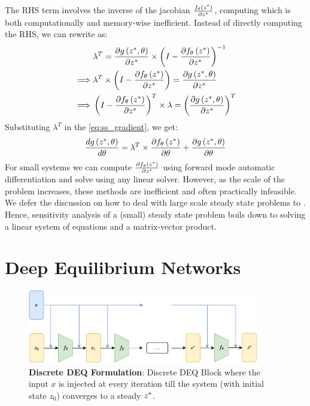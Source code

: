 The RHS term involves the inverse of the jacobian $\frac{f_\theta\left(z^*\right)}{\partial z^*}$, computing which is both computationally and memory-wise inefficient. Instead of directly computing the RHS, we can rewrite  as:
%
\begin{align}
  & \lambda^T = \frac{\partial g\left(z^*, \theta\right)}{\partial z^*} \times \left( I - \frac{\partial f_\theta\left(z^*\right)}{\partial z^*} \right)^{-1}\\
  \implies & \lambda^T \times \left( I - \frac{\partial f_\theta\left(z^*\right)}{\partial z^*} \right) = \frac{\partial g\left(z^*, \theta\right)}{\partial z^*}\\
  \implies & \left( I - \frac{\partial f_\theta\left(z^*\right)}{\partial z^*} \right)^T \times \lambda = \left(\frac{\partial g\left(z^*, \theta\right)}{\partial z^*}\right)^T \label{eq:ss_lambda_linear}
\end{align}
%
Substituting $\lambda^T$ in the \cref{eq:ss_gradient}, we get:
%
\begin{equation}
  \frac{d g\left(z^*, \theta\right)}{d \theta} = \lambda^T \times \frac{\partial f_\theta\left(z^*\right)}{\partial \theta} + \frac{\partial g\left(z^*, \theta\right)}{\partial \theta} \label{eq:ss_total_gradient}
\end{equation}
%
For small systems we can compute $\frac{\partial f_\theta\left(z^*\right)}{\partial z^*}$ using forward mode automatic differentiation and solve  using any linear solver. However, as the scale of the problem increases, these methods are inefficient and often practically infeasible. We defer the discussion on how to deal with large scale steady state problems to . Hence, sensitivity analysis of a (small) steady state problem boils down to solving a linear system of equations and a matrix-vector product.


\section{Deep Equilibrium Networks}
\label{sec:deep_equilibrium_networks}

\begin{figure}[t]
  \centering
  \includegraphics[width=0.9\textwidth]{../figures/deep_equilibrium_models/model_architecture.pdf}
  \caption{\textbf{Discrete DEQ Formulation}: Discrete DEQ Block where the input $x$ is injected at every iteration till the system (with initial state $z_0$) converges to a steady $z^*$.}
  \label{fig:model_architecture_discrete_deq}
\end{figure}

